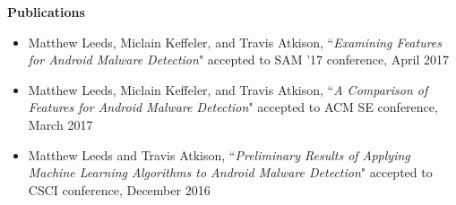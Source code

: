 \documentclass[11pt]{article}
\begin{document}
\vspace{0.8em}
\hbox{\large \textbf{Publications}}

\begin{itemize}[itemindent=0em]
  \item Matthew Leeds, Miclain Keffeler, and Travis Atkison, ``\textit{Examining Features for Android Malware Detection}" accepted to SAM '17 conference, April 2017
  \item Matthew Leeds, Miclain Keffeler, and Travis Atkison, ``\textit{A Comparison of Features for Android Malware Detection}" accepted to ACM SE conference, March 2017
  \item Matthew Leeds and Travis Atkison, ``\textit{Preliminary Results of Applying Machine Learning Algorithms to Android Malware Detection}" accepted to CSCI conference, December 2016
\end{itemize}
\end{document}
